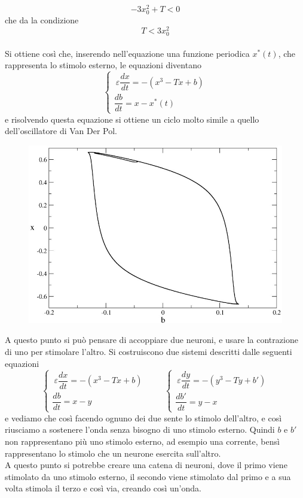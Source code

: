 \documentclass[12pt]{article}
\begin{document}
$$
	-3x_0^2 + T < 0
$$ 
che da la condizione 
\begin{equation}
	T < 3x_0^2
\end{equation} \\
Si ottiene così che, inserendo nell'equazione una funzione periodica $x^*(t)$, che rappresenta lo stimolo esterno, le equazioni diventano
\begin{equation}
	\begin{cases}
		\ \varepsilon \dfrac{dx}{dt} = -(x^3 - Tx + b) \\
		\dfrac{db}{dt} = x - x^*(t)
	\end{cases}
\end{equation}
e risolvendo questa equazione si ottiene un ciclo molto simile a quello dell'oscillatore di Van Der Pol. \begin{figure}[H]
	\centering
	\includegraphics[scale=0.7]{Heartbeat}
\end{figure}
A questo punto si può pensare di accoppiare due neuroni, e usare la contrazione di uno per stimolare l'altro. Si costruiscono due sistemi descritti dalle seguenti equazioni
\begin{equation}
	\begin{cases}
		\ \varepsilon \dfrac{dx}{dt} = -(x^3 - Tx + b) \\
		\dfrac{db}{dt} = x - y
	\end{cases} \ \ \ \ \ \ \ \ \ \ 
	\begin{cases}
		\ \varepsilon \dfrac{dy}{dt} = -(y^3 - Ty + b') \\
		\dfrac{db'}{dt} = y - x 
	\end{cases}
\end{equation}
e vediamo che così facendo ognuno dei due sente lo stimolo dell'altro, e così riusciamo a sostenere l'onda senza bisogno di uno stimolo esterno. Quindi $b$ e $b'$ non rappresentano più uno stimolo esterno, ad esempio una corrente, bensì rappresentano lo stimolo che un neurone esercita sull'altro. \\
A questo punto si potrebbe creare una catena di neuroni, dove il primo viene stimolato da uno stimolo esterno, il secondo viene stimolato dal primo e a sua volta stimola il terzo e così via, creando così un'onda.
\end{document}
